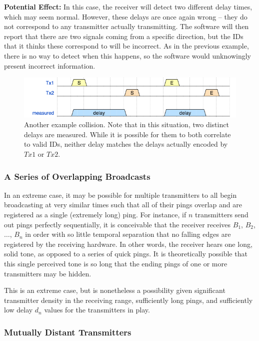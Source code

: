 \documentclass[12pt]{article}
\begin{document}
{\bf Potential Effect:}
In this case, the receiver will detect two different delay times, which may
seem normal. However, these delays are once again wrong -- they do not
correspond to any transmitter actually transmitting.
The software will then report that there are two signals coming from a
specific direction, but the IDs that it thinks these correspond to will
be incorrect.
As in the previous example, there is no way to detect when this happens, so the
software would unknowingly present incorrect information.

\begin{figure}[h]
	\centering
		\includegraphics[scale=0.7]{collision2}
		
		\caption{Another example collision. Note that in this situation,
		two distinct delays are measured. While it is possible for them
		to both correlate to valid IDs, neither delay matches the delays
		actually encoded by $Tx1$ or $Tx2$.}
\end{figure}

\subsubsection{A Series of Overlapping Broadcasts}

In an extreme case, it may be possible for multiple transmitters to all begin
broadcasting at very similar times such that all of their pings overlap and are
registered as a single (extremely long) ping.
For instance, if $n$ transmitters send out pings perfectly sequentially,
it is conceivable
that the receiver receives $B_1$, $B_2$, $\dots$, $B_n$ in order with so little
temporal separation that no falling edges are registered by the receiving
hardware.
In other words, the receiver hears one long, solid tone, as opposed to a series
of quick pings. It is theoretically possible that this single perceived tone
is so long that the ending pings of one or more transmitters may be hidden.

This is an extreme case, but is nonetheless a possibility given significant
transmitter density in the receiving range, sufficiently long pings, and
sufficiently low delay $d_n$ values for the transmitters in play.

\subsubsection{Mutually Distant Transmitters}
\end{document}
